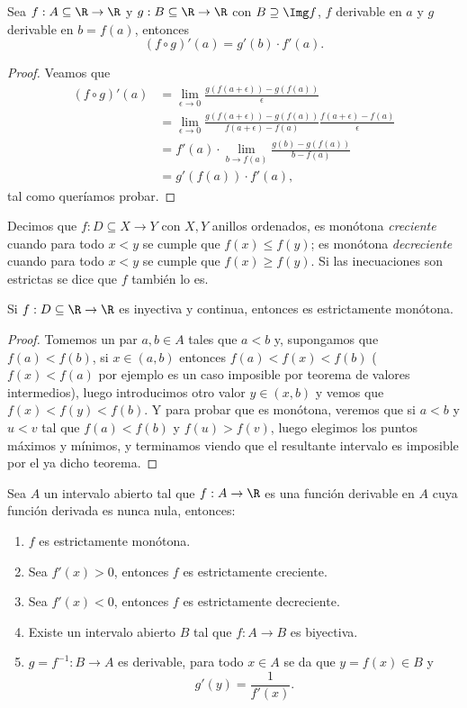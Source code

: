 \documentclass[11pt,oneside,a4paper]{book}
\begin{document}
\begin{thm}
Sea $f:A\subseteq\R\rightarrow\R$ y $g:B\subseteq\R\rightarrow\R$ con $B\supseteq\Img f$, $f$ derivable en $a$ y $g$ derivable en $b=f(a)$, entonces
$$(f\circ g)'(a)=g'(b)\cdot f'(a).$$
\end{thm}
\begin{proof}
Veamos que
\begin{align*}
(f\circ g)'(a)&=\lim_{\epsilon\to 0}\frac{g(f(a+\epsilon))-g(f(a))}{\epsilon}\\
&=\lim_{\epsilon\to 0}\frac{g(f(a+\epsilon))-g(f(a))}{f(a+\epsilon)-f(a)}\frac{f(a+\epsilon)-f(a)}{\epsilon}\\
&=f'(a)\cdot\lim_{b\to f(a)}\frac{g(b)-g(f(a))}{b-f(a)}\\
&=g'(f(a))\cdot f'(a),
\end{align*}
tal como queríamos probar.
\end{proof}
\begin{mydef}
Decimos que $f:D\subseteq X\rightarrow Y$ con $X,Y$ anillos ordenados, es monótona \textit{creciente} cuando para todo $x\lt y$ se cumple que $f(x)\leq f(y)$; es monótona \textit{decreciente} cuando para todo $x\lt y$ se cumple que $f(x)\geq f(y)$. Si las inecuaciones son estrictas se dice que $f$ también lo es.
\end{mydef}
\begin{thm}
Si $f:D\subseteq\R\rightarrow\R$ es inyectiva y continua, entonces es estrictamente monótona.
\end{thm}
\begin{proof}
Tomemos un par $a,b\in A$ tales que $a\lt b$ y, supongamos que $f(a)\lt f(b)$, si $x\in(a,b)$ entonces $f(a)\lt f(x)\lt f(b)$ ($f(x)\lt f(a)$ por ejemplo es un caso imposible por teorema de valores intermedios), luego introducimos otro valor $y\in(x,b)$ y vemos que $f(x)\lt f(y)\lt f(b)$. Y para probar que es monótona, veremos que si $a\lt b$ y $u\lt v$ tal que $f(a)\lt f(b)$ y $f(u)\gt f(v)$, luego elegimos los puntos máximos y mínimos, y terminamos viendo que el resultante intervalo es imposible por el ya dicho teorema.
\end{proof}
\begin{thm}
Sea $A$ un intervalo abierto tal que $f:A\rightarrow\R$ es una función derivable en $A$ cuya función derivada es nunca nula, entonces:
\begin{enumerate}[$a)$]
\item $f$ es estrictamente monótona.
\item Sea $f'(x)\gt 0$, entonces $f$ es estrictamente creciente.
\item Sea $f'(x)\lt 0$, entonces $f$ es estrictamente decreciente.
\item Existe un intervalo abierto $B$ tal que $f:A\rightarrow B$ es biyectiva.
\item $g=f^{-1}:B\rightarrow A$ es derivable, para todo $x\in A$ se da que $y=f(x)\in B$ y
\begin{equation}
g'(y)=\frac{1}{f'(x)}.
\end{equation}
\end{enumerate}
\end{thm}
\end{document}
